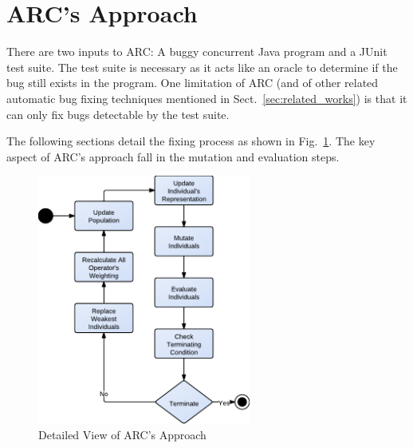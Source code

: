 \section{ARC's Approach}
\label{sec:approach}



There are two inputs to ARC: A buggy concurrent Java program and a JUnit test
suite. The test suite is necessary as it acts like an oracle to determine if
the bug still exists in the program. One limitation of ARC (and of other
related automatic bug fixing techniques mentioned in
Sect.~\ref{sec:related_works}) is that it can only fix bugs detectable by the
test suite.



The following sections detail the fixing process as shown in
Fig.~\ref{fig:phases_internals}. The key aspect of ARC's approach fall in the
mutation and evaluation steps.

\begin{figure}[t!]
  \centering
  \includegraphics[width=7cm]{figures/phases.pdf}
  \caption{Detailed View of ARC's Approach}
  \label{fig:phases_internals}
\end{figure}

